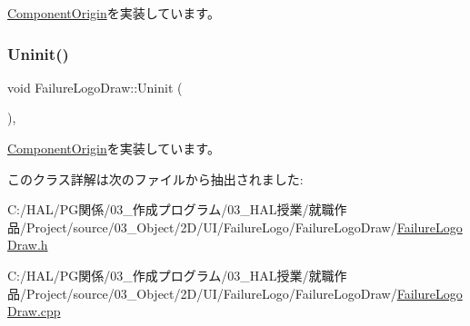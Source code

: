 \mbox{\hyperlink{class_component_origin_a9f674891257f2272b1636d8b6bb05d81}{Component\+Origin}}を実装しています。

\mbox{\label{class_failure_logo_draw_a97646253380b54f37565650e211f33cd}} 
\subsubsection{\texorpdfstring{Uninit()}{Uninit()}}
{\footnotesize\ttfamily void Failure\+Logo\+Draw\+::\+Uninit (\begin{DoxyParamCaption}{ }\end{DoxyParamCaption})\hspace{0.3cm}{\ttfamily [override]}, {\ttfamily [virtual]}}



\mbox{\hyperlink{class_component_origin_a9f89a93f9c1954bd53f9750e35e6089d}{Component\+Origin}}を実装しています。



このクラス詳解は次のファイルから抽出されました\+:\begin{DoxyCompactItemize}
\item 
C\+:/\+H\+A\+L/\+P\+G関係/03\+\_\+作成プログラム/03\+\_\+\+H\+A\+L授業/就職作品/\+Project/source/03\+\_\+\+Object/2\+D/\+U\+I/\+Failure\+Logo/\+Failure\+Logo\+Draw/\mbox{\hyperlink{_failure_logo_draw_8h}{Failure\+Logo\+Draw.\+h}}\item 
C\+:/\+H\+A\+L/\+P\+G関係/03\+\_\+作成プログラム/03\+\_\+\+H\+A\+L授業/就職作品/\+Project/source/03\+\_\+\+Object/2\+D/\+U\+I/\+Failure\+Logo/\+Failure\+Logo\+Draw/\mbox{\hyperlink{_failure_logo_draw_8cpp}{Failure\+Logo\+Draw.\+cpp}}\end{DoxyCompactItemize}
